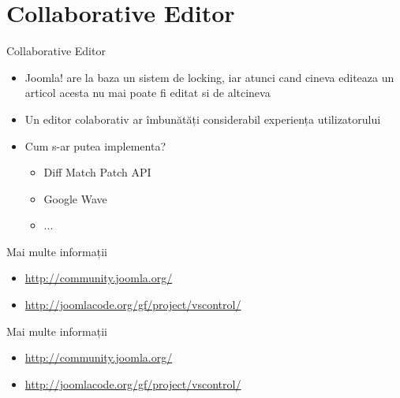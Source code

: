 \documentclass{beamer}
\begin{document}
\section{Collaborative Editor}

\begin{frame}{Collaborative Editor}
  \begin{itemize}
   \item Joomla! are la baza un sistem de locking, iar atunci cand cineva editeaza un articol acesta nu mai poate fi editat si de altcineva 
   \pause
   \item Un editor colaborativ ar îmbunătăți considerabil experiența utilizatorului 
   \pause 
   \item Cum s-ar putea implementa?
   \pause
   \begin{itemize}
   \item Diff Match Patch API
   \pause
   \item Google Wave
   \pause
   \item ...
   \end{itemize}
  \end{itemize}
\end{frame}

\begin{frame}{Mai multe informații}
	\begin{itemize}
	\item \url{http://community.joomla.org/}
	\item \url{http://joomlacode.org/gf/project/vscontrol/}
	\end{itemize}
\end{frame}

\begin{frame}{Mai multe informații}
	\begin{itemize}
	\item \url{http://community.joomla.org/}
	\item \url{http://joomlacode.org/gf/project/vscontrol/}
	\end{itemize}
\end{frame}
\end{document}
